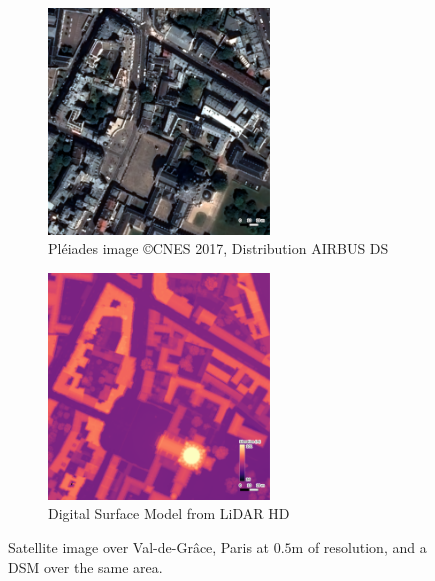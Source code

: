 \begin{figure}
    \centering
    \begin{subfigure}[t]{0.5\linewidth}
        \centering
        \includegraphics[height=6cm]{Images/0_Intro/Paris_Ortho.png}
        \caption{Pléiades image \copyright CNES 2017, Distribution AIRBUS DS}
        \label{fig:VDG_ortho}
    \end{subfigure}\hfill
    \begin{subfigure}[t]{0.5\linewidth}
        \centering
        \includegraphics[height=6cm]{Images/0_Intro/Paris_DSM.png}
        \caption{Digital Surface Model from LiDAR HD}
        \label{fig:VDG_dsm}
    \end{subfigure}
    \caption{Satellite image over Val-de-Grâce, Paris at $0.5$m of resolution, and a DSM over the same area.}
    \label{fig:intro_dsm_example}
\end{figure}

